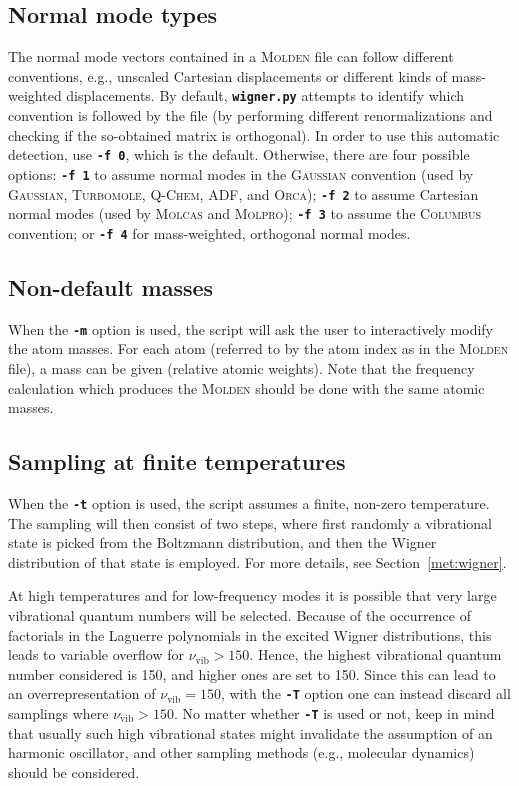 \documentclass[a4paper,10pt,DIV=15,openany,twoside=false]{scrbook}
\newcommand{\ttt}[1]{\textbf{\texttt{#1}}}
\begin{document}
\subsection{Normal mode types}

The normal mode vectors contained in a \textsc{Molden} file can follow different conventions, e.g., unscaled Cartesian displacements or different kinds of mass-weighted displacements.
By default, \ttt{wigner.py} attempts to identify which convention is followed by the file (by performing different renormalizations and checking if the so-obtained matrix is orthogonal).
In order to use this automatic detection, use \ttt{-f 0}, which is the default.
Otherwise, there are four possible options: \ttt{-f 1} to assume normal modes in the \textsc{Gaussian} convention (used by \textsc{Gaussian}, \textsc{Turbomole}, \textsc{Q-Chem}, ADF, and \textsc{Orca}); \ttt{-f 2} to assume Cartesian normal modes (used by \textsc{Molcas} and \textsc{Molpro}); \ttt{-f 3} to assume the \textsc{Columbus} convention; or \ttt{-f 4} for mass-weighted, orthogonal normal modes.

\subsection{Non-default masses}

When the \ttt{-m} option is used, the script will ask the user to interactively modify the atom masses. For each atom (referred to by the atom index as in the \textsc{Molden} file), a mass can be given (relative atomic weights). Note that the frequency calculation which produces the \textsc{Molden} should be done with the same atomic masses.

\subsection{Sampling at finite temperatures}

When the \ttt{-t} option is used, the script assumes a finite, non-zero temperature.
The sampling will then consist of two steps, where first randomly a vibrational state is picked from the Boltzmann distribution, and then the Wigner distribution of that state is employed.
For more details, see Section~\ref{met:wigner}.

At high temperatures and for low-frequency modes it is possible that very large vibrational quantum numbers will be selected.
Because of the occurrence of factorials in the Laguerre polynomials in the excited Wigner distributions, this leads to variable overflow for $\nu_\text{vib}>150$. Hence, the highest vibrational quantum number considered is 150, and higher ones are set to 150.
Since this can lead to an overrepresentation of $\nu_\text{vib}=150$, with the \ttt{-T} option one can instead discard all samplings where $\nu_\text{vib}>150$.
No matter whether \ttt{-T} is used or not, keep in mind that usually such high vibrational states might invalidate the assumption of an harmonic oscillator, and other sampling methods (e.g., molecular dynamics) should be considered.
\end{document}
